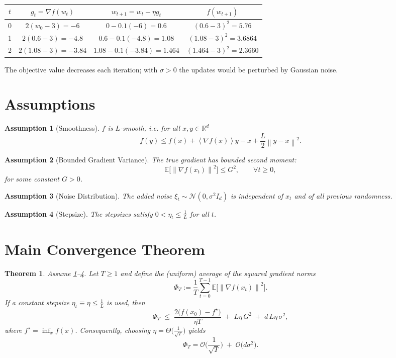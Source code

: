 \documentclass{article}
\newtheorem{theorem}{Theorem}
\newtheorem{assumption}{Assumption}
\newcommand{\E}{\mathbb{E}}
\newcommand{\norm}[1]{\left\|#1\right\|}
\newcommand{\inner}[1]{\left\langle #1 \right\rangle}
\begin{document}
\begin{center}
\begin{tabular}{c|c|c|c}
$t$ & $g_{t}=\nabla f(w_{t})$ & $w_{t+1}=w_{t}-\eta g_{t}$ & $f(w_{t+1})$\\ \hline
0 & $2(w_{0}-3)=-6$ & $0-0.1(-6)=0.6$ & $(0.6-3)^{2}=5.76$\\
1 & $2(0.6-3)=-4.8$ & $0.6-0.1(-4.8)=1.08$ & $(1.08-3)^{2}=3.6864$\\
2 & $2(1.08-3)=-3.84$ & $1.08-0.1(-3.84)=1.464$ & $(1.464-3)^{2}=2.3660$\\
\end{tabular}
\end{center}
The objective value decreases each iteration; with $\sigma>0$ the updates would be perturbed by Gaussian noise.

\newpage
\section*{Assumptions}
\begin{assumption}[Smoothness]\label{ass:smooth}
$f$ is $L$‑smooth, i.e. for all $x,y\in\mathbb{R}^{d}$
\[
f(y)\le f(x)+\inner{\nabla f(x)}{y-x}+\frac{L}{2}\norm{y-x}^{2}.
\]
\end{assumption}
\begin{assumption}[Bounded Gradient Variance]\label{ass:var}
The true gradient has bounded second moment:
\[
\E\big[\norm{\nabla f(x_{t})}^{2}\big]\le G^{2},\qquad \forall t\ge0,
\]
for some constant $G>0$.
\end{assumption}
\begin{assumption}[Noise Distribution]\label{ass:noise}
The added noise $\xi_{t}\sim\mathcal{N}(0,\sigma^{2}I_{d})$ is independent of $x_{t}$ and of all previous randomness.
\end{assumption}
\begin{assumption}[Stepsize]\label{ass:stepsize}
The stepsizes satisfy $0<\eta_{t}\le \frac{1}{L}$ for all $t$.
\end{assumption}

\section*{Main Convergence Theorem}
\begin{theorem}\label{thm:main}
Assume \ref{ass:smooth}–\ref{ass:stepsize}. Let $T\ge1$ and define the (uniform) average of the squared gradient norms
\[
\Phi_{T}:=\frac{1}{T}\sum_{t=0}^{T-1}\E\!\big[\norm{\nabla f(x_{t})}^{2}\big].
\]
If a constant stepsize $\eta_{t}\equiv\eta\le \frac{1}{L}$ is used, then
\[
\Phi_{T}\;\le\; \frac{2\big(f(x_{0})-f^{\star}\big)}{\eta T}
          \;+\; L\eta\,G^{2}
          \;+\; d\,L\eta\,\sigma^{2},
\tag{1}
\]
where $f^{\star}= \inf_{x}f(x)$. Consequently, choosing $\eta = \Theta\!\big(\frac{1}{\sqrt{T}}\big)$ yields
\[
\Phi_{T}= \mathcal{O}\!\Big(\frac{1}{\sqrt{T}}\Big)
           \;+\; \mathcal{O}\!\big(d\sigma^{2}\big).
\]
\end{theorem}
\end{document}
